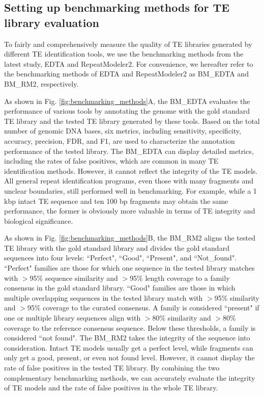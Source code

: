 \documentclass{bmcart}
\begin{document}
\subsection*{Setting up benchmarking methods for TE library evaluation}
To fairly and comprehensively measure the quality of TE libraries generated by different TE identification tools, we use the benchmarking methods from the latest study, EDTA and RepeatModeler2. For convenience, we hereafter refer to the benchmarking methods of EDTA and RepeatModeler2 as BM\_EDTA and BM\_RM2, respectively. 

As shown in Fig. \ref{fig:benchmarking_methods}A, the BM\_EDTA evaluates the performance of various tools by annotating the genome with the gold standard TE library and the tested TE library generated by these tools. Based on the total number of genomic DNA bases, six metrics, including sensitivity, specificity, accuracy, precision, FDR, and F1, are used to characterize the annotation performance of the tested library\cite{ou2019benchmarking}. The BM\_EDTA can display detailed metrics, including the rates of false positives, which are common in many TE identification methods. However, it cannot reflect the integrity of the TE models. All general repeat identification programs, even those with many fragments and unclear boundaries, still performed well in benchmarking\cite{ou2019benchmarking}. For example, while a 1 kbp intact TE sequence and ten 100 bp fragments may obtain the same performance, the former is obviously more valuable in terms of TE integrity and biological significance.

As shown in Fig. \ref{fig:benchmarking_methods}B, the BM\_RM2 aligns the tested TE library with the gold standard library and divides the gold standard sequences into four levels: ``Perfect", ``Good", ``Present", and ``Not\_found". ``Perfect" families are those for which one sequence in the tested library matches with $>$95\% sequence similarity and $>$95\% length coverage to a family consensus in the gold standard library. ``Good" families are those in which multiple overlapping sequences in the tested library match with $>$95\% similarity and $>$95\% coverage to the curated consensus. A family is considered ``present" if one or multiple library sequences align with $>$80\% similarity and $>$80\% coverage to the reference consensus sequence. Below these thresholds, a family is considered ``not found"\cite{flynn2020repeatmodeler2}. The BM\_RM2 takes the integrity of the sequence into consideration. Intact TE models usually get a perfect level, while fragments can only get a good, present, or even not found level. However, it cannot display the rate of false positives in the tested TE library. By combining the two complementary benchmarking methods, we can accurately evaluate the integrity of TE models and the rate of false positives in the whole TE library.
\end{document}
